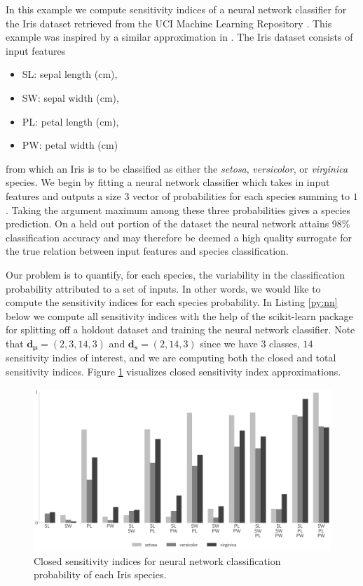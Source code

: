 \documentclass[graybox]{svmult}
\begin{document}
In this example we compute sensitivity indices of a neural network classifier for the Iris dataset retrieved from the UCI Machine Learning Repository \cite{uci_ml_repo}. This example was inspired by a similar approximation in \cite{hoyt2021efficient}. The Iris dataset consists of input features
\begin{itemize}
    \item SL: sepal length (cm),
    \item SW: sepal width (cm),
    \item PL: petal length (cm),
    \item PW: petal width (cm)
\end{itemize}
from which an Iris is to be classified as either the \emph{setosa}, \emph{versicolor}, or \emph{virginica} species. We begin by fitting a neural network classifier \cite{he2015delving} which takes in input features and outputs a size $3$ vector of probabilities for each species summing to $1$. Taking the argument maximum among these three probabilities gives a species prediction. On a held out portion of the dataset the neural network attains 98\% classification accuracy and may therefore be deemed a high quality surrogate for the true relation between input features and species classification. 

Our problem is to quantify, for each species, the variability in the classification probability attributed to a set of inputs. In other words, we would like to compute the sensitivity indices for each species probability. In Listing \ref{py:nn} below we compute all sensitivity indices with the help of the scikit-learn package \cite{scikit-learn} for splitting off a holdout dataset and training the neural network classifier. Note that $\boldsymbol{d}_{\boldsymbol{\mu}} = (2,3,14,3)$ and $\boldsymbol{d}_{\boldsymbol{s}} = (2,14,3)$ since we have $3$ classes, $14$ sensitivity indies of interest, and we are computing both the closed and total sensitivity indices. Figure \ref{fig:nn_si} visualizes closed sensitivity index approximations. 



\begin{figure}[t]
    \centering
    \includegraphics[width=.8\textwidth]{figs/nn_si.pdf}
    \caption{Closed sensitivity indices for neural network classification probability of each Iris species.}
    \label{fig:nn_si}
\end{figure}
\end{document}
